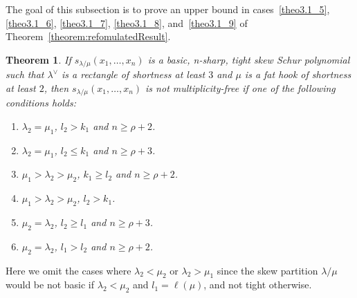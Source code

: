 \documentclass[10pt]{article}
\newtheorem{theorem}{Theorem}[section]
\theoremstyle{definition}
\begin{document}
The goal of this subsection is to prove an upper bound in cases~\ref{theo3.1_5}, \ref{theo3.1_6}, \ref{theo3.1_7}, \ref{theo3.1_8}, and~\ref{theo3.1_9} of Theorem~\ref{theorem:refomulatedResult}.


\begin{theorem}
\label{thm:suffshort3}
If $s_{\lambda/\mu}(x_1,\ldots,x_n)$ is a basic, n-sharp, tight skew Schur polynomial such that $\lambda^\vee$ is a rectangle of shortness at least $3$ and $\mu$ is a fat hook of shortness at least $2$, then $s_{\lambda/\mu}(x_1,\ldots,x_n)$ is not multiplicity-free if one of the following conditions holds:
\begin{enumerate}[label=(\Roman{*})]
 \item\label{theo3.13_1} $\lambda_2 = \mu_1$, $l_2 > k_1$ and $n\geq \rho+2$.
 \item\label{theo3.13_2} $\lambda_2 = \mu_1$, $l_2 \leq k_1$ and $n\geq \rho+3$.
 \item\label{theo3.13_3} $\mu_1 > \lambda_2 > \mu_2$, $k_1 \geq l_2$ and $n \geq \rho+2$.
 \item\label{theo3.13_4} $\mu_1 > \lambda_2 > \mu_2$, $l_2 > k_1$.
 \item\label{theo3.13_5} $\mu_2 = \lambda_2$, $l_2 \geq l_1$ and $n\geq \rho+3$.
 \item\label{theo3.13_6} $\mu_2 = \lambda_2$, $l_1 > l_2$ and $n\geq \rho+2$.
\end{enumerate}
\end{theorem}

Here we omit the cases where $\lambda_2<\mu_2$ or $\lambda_2>\mu_1$ since the skew partition $\lambda/\mu$ would be not basic if $\lambda_2<\mu_2$ and $l_1 = \ell(\mu)$, and not tight otherwise. 
\end{document}
